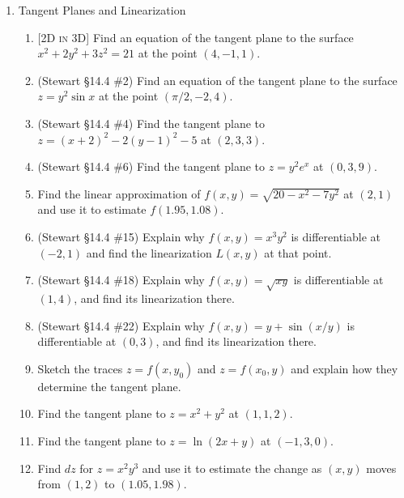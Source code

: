 \documentclass[12pt]{article}
\newcommand{\dimtag}[1]{{\footnotesize\textsc{[#1]}}\;}
\begin{document}
\begin{enumerate}
\item Tangent Planes and Linearization
    \begin{enumerate}
        \item \dimtag{2D in 3D} Find an equation of the tangent plane to the surface $x^2 + 2y^2 + 3z^2 = 21$ at the point $(4, -1, 1)$.
        \item (Stewart \S14.4 \#2) Find an equation of the tangent plane to the surface $z = y^2 \sin x$ at the point $(\pi/2, -2, 4)$.
        \item (Stewart \S14.4 \#4) Find the tangent plane to $z = (x+2)^2 - 2(y-1)^2 - 5$ at $(2, 3, 3)$.
        \item (Stewart \S14.4 \#6) Find the tangent plane to $z = y^2 e^x$ at $(0, 3, 9)$.
        \item Find the linear approximation of $f(x,y) = \sqrt{20 - x^2 - 7y^2}$ at $(2, 1)$ and use it to estimate $f(1.95, 1.08)$.
        \item (Stewart \S14.4 \#15) Explain why $f(x,y) = x^3 y^2$ is differentiable at $(-2,1)$ and find the linearization $L(x,y)$ at that point.
        \item (Stewart \S14.4 \#18) Explain why $f(x,y) = \sqrt{xy}$ is differentiable at $(1,4)$, and find its linearization there.
        \item (Stewart \S14.4 \#22) Explain why $f(x,y) = y + \sin(x/y)$ is differentiable at $(0,3)$, and find its linearization there.
        \item Sketch the traces $z=f(x, y_0)$ and $z=f(x_0, y)$ and explain how they determine the tangent plane.
        \item Find the tangent plane to $z=x^2+y^2$ at $(1,1,2)$.
        \item Find the tangent plane to $z=\ln(2x+y)$ at $(-1,3,0)$.
        \item Find $dz$ for $z=x^2 y^3$ and use it to estimate the change as $(x,y)$ moves from $(1,2)$ to $(1.05,1.98)$.
    \end{enumerate}
\newpage


\end{enumerate}
\end{document}
